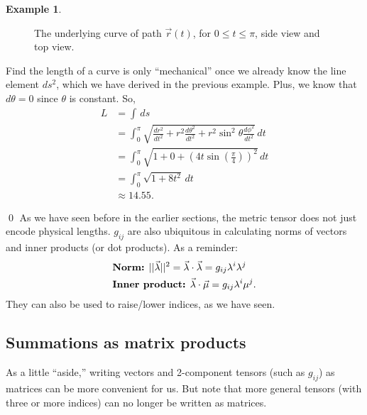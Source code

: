 \documentclass{book}
\theoremstyle{definition}
\newtheorem{exmp}{Example}[section]
\begin{document}
\begin{exmp}
\begin{figure}[h!]
	\caption{The underlying curve of path $\vec{r}(t)$, for $0 \leq t \leq \pi$, side view and top view.}
\end{figure}
Find the length of a curve is only ``mechanical'' once we already know the line element $ds^2$, which we have derived in the previous example. Plus, we know that $d\theta = 0$ since $\theta$ is constant. So,
\begin{align*}
L &= \int\,ds\\ 
&= \int_{0}^{\pi}\sqrt{\frac{dr^2}{dt^2} + r^2\frac{d\theta^2}{dt^2} + r^2\sin^2\theta\frac{d\phi^2}{dt^2}}\,dt\\
&= \int_{0}^{\pi}\sqrt{1 + 0 + \left( 4t\sin\left(\frac{\pi}{4} \right) \right) ^2}\,dt\\
&= \int_{0}^{\pi}\sqrt{1 + 8t^2}\,dt\\
&\approx 14.55. 
\end{align*}
\end{exmp}\qed
As we have seen before in the earlier sections, the metric tensor does not just encode physical lengths. $g_{ij}$ are also ubiquitous in calculating norms of vectors and inner products (or dot products). As a reminder:
\begin{align*}
&\text{\textbf{Norm:} } \vert\vert \vec{\lambda} \vert\vert^2 = \vec{\lambda}\cdot\vec{\lambda} = g_{ij}\lambda^i\lambda^j\\
&\text{\textbf{Inner product:} } \vec{\lambda}\cdot\vec{\mu} = g_{ij}\lambda^i\mu^j.
\end{align*}
They can also be used to raise/lower indices, as we have seen. 
\subsection{Summations as matrix products}
As a little ``aside,'' writing vectors and 2-component tensors (such as $g_{ij}$) as matrices can be more convenient for us. But note that more general tensors (with three or more indices) can no longer be written as matrices.\\
\end{document}

